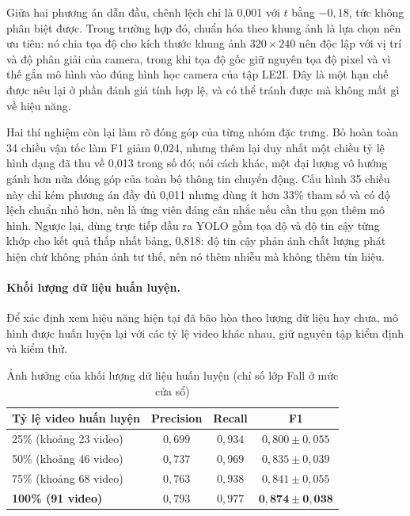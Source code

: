 Giữa hai phương án dẫn đầu, chênh lệch chỉ là 0,001 với $t$ bằng $-0{,}18$, tức không phân biệt được. Trong trường hợp đó, chuẩn hóa theo khung ảnh là lựa chọn nên ưu tiên: nó chia tọa độ cho kích thước khung ảnh $320\times240$ nên độc lập với vị trí và độ phân giải của camera, trong khi tọa độ gốc giữ nguyên tọa độ pixel và vì thế gắn mô hình vào đúng hình học camera của tập LE2I. Đây là một hạn chế được nêu lại ở phần đánh giá tính hợp lệ, và có thể tránh được mà không mất gì về hiệu năng.

Hai thí nghiệm còn lại làm rõ đóng góp của từng nhóm đặc trưng. Bỏ hoàn toàn 34 chiều vận tốc làm F1 giảm 0,024, nhưng thêm lại duy nhất một chiều tỷ lệ hình dạng đã thu về 0,013 trong số đó; nói cách khác, một đại lượng vô hướng gánh hơn nửa đóng góp của toàn bộ thông tin chuyển động. Cấu hình 35 chiều này chỉ kém phương án đầy đủ 0,011 nhưng dùng ít hơn 33\% tham số và có độ lệch chuẩn nhỏ hơn, nên là ứng viên đáng cân nhắc nếu cần thu gọn thêm mô hình. Ngược lại, dùng trực tiếp đầu ra YOLO gồm tọa độ và độ tin cậy từng khớp cho kết quả thấp nhất bảng, 0,818: độ tin cậy phản ánh chất lượng phát hiện chứ không phản ánh tư thế, nên nó thêm nhiễu mà không thêm tín hiệu.

\paragraph{Khối lượng dữ liệu huấn luyện.}
Để xác định xem hiệu năng hiện tại đã bão hòa theo lượng dữ liệu hay chưa, mô hình được huấn luyện lại với các tỷ lệ video khác nhau, giữ nguyên tập kiểm định và kiểm thử.

\begin{table}[htbp]
\centering
\caption{Ảnh hưởng của khối lượng dữ liệu huấn luyện (chỉ số lớp Fall ở mức cửa sổ)}
\label{tab:lstm_data_volume}
\small
\begin{tabular}{|l|c|c|c|}
\hline
\textbf{Tỷ lệ video huấn luyện} & \textbf{Precision} & \textbf{Recall} & \textbf{F1} \\
\hline
25\% (khoảng 23 video) & $0{,}699$ & $0{,}934$ & $0{,}800\pm0{,}055$ \\
\hline
50\% (khoảng 46 video) & $0{,}737$ & $0{,}969$ & $0{,}835\pm0{,}039$ \\
\hline
75\% (khoảng 68 video) & $0{,}763$ & $0{,}938$ & $0{,}841\pm0{,}055$ \\
\hline
\textbf{100\% (91 video)} & $0{,}793$ & $0{,}977$ & $\mathbf{0{,}874\pm0{,}038}$ \\
\hline
\end{tabular}
\end{table}

